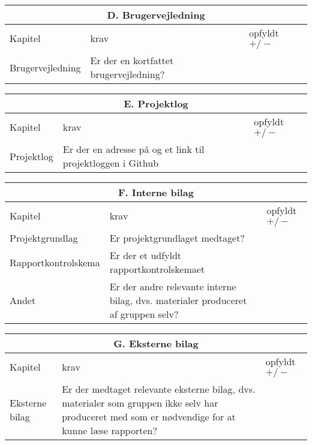 \begin{center}
\begin{longtable}{|m{3.5cm}|m{10cm}|m{2.5cm}|}
\hline
\multicolumn{3}{|c|}{D. Brugervejledning} \\ \hline
Kapitel & krav & opfyldt $+/-$ \\ \hline
Brugervejledning & Er der en kortfattet brugervejledning? & \\ \hline

\end{longtable}
\end{center}

\begin{center}
\begin{longtable}{|m{3.5cm}|m{10cm}|m{2.5cm}|}
\hline
\multicolumn{3}{|c|}{E. Projektlog} \\ \hline
Kapitel & krav & opfyldt $+/-$ \\ \hline
Projektlog & Er der en adresse på og et link til projektloggen i Github & \\ \hline
\end{longtable}
\end{center}

\begin{center}
\begin{longtable}{|m{3.5cm}|m{10cm}|m{2.5cm}|}
\hline
\multicolumn{3}{|c|}{F. Interne bilag} \\ \hline
Kapitel & krav & opfyldt $+/-$ \\ \hline
Projektgrundlag & Er projektgrundlaget medtaget? & \\ \hline
Rapportkontrolskema & Er der et udfyldt rapportkontrolskemaet & \\ \hline
Andet & Er der andre relevante interne bilag, dvs. materialer produceret af gruppen selv? & \\ \hline
\end{longtable}
\end{center}

\begin{center}
\begin{longtable}{|m{3.5cm}|m{10cm}|m{2.5cm}|}
\hline
\multicolumn{3}{|c|}{G. Eksterne bilag} \\ \hline
Kapitel & krav & opfyldt $+/-$ \\ \hline
Eksterne bilag & 
Er der medtaget relevante eksterne bilag, dvs. materialer som gruppen ikke selv har produceret med som er nødvendige for at kunne læse rapporten? & \\ 
\hline
\end{longtable}
\end{center}

